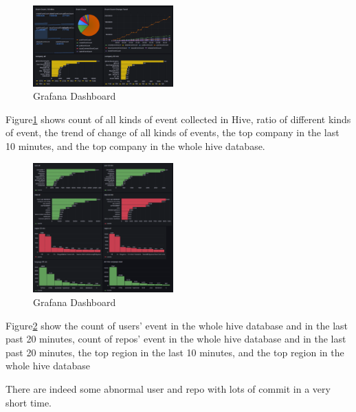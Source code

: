 \begin{figure}[H]
    \centering
    \includegraphics[width=0.48\textwidth]{pic/vis-1.png}
    \caption{Grafana Dashboard}
    \label{fig:grafana-1}
\end{figure}

Figure\ref{fig:grafana-1} shows count of all kinds of event collected in Hive, ratio of different kinds of event, the trend of change of all kinds of events, the top company in the last 10 minutes, and the top company in the whole hive database.




\begin{figure}[H]
    \centering
    \includegraphics[width=0.48\textwidth]{pic/vis-2.png}
    \caption{Grafana Dashboard}
    \label{fig:grafana-2}
\end{figure}

Figure\ref{fig:grafana-2} show the count of users' event in the whole hive database and in the last past 20 minutes, count of repos' event in the whole hive database and in the last past 20 minutes, the top region in the last 10 minutes, and the top region in the whole hive database

There are indeed some abnormal user and repo with lots of commit in a very short time.
